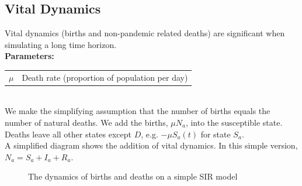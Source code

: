 \documentclass{article}
\begin{document}
\subsection{Vital Dynamics}
Vital dynamics (births and non-pandemic related deaths) are significant when simulating a long time horizon. \\
\textbf{Parameters:}\\
\begin{tabular}{rl}
$\mu$ &Death rate (proportion of population per day)\\
\end{tabular}\\
We make the simplifying assumption that the number of births equals the number of natural deaths. We add the births, $\mu N_a$, into the susceptible state. Deaths leave all other states except $D$, e.g. $-\mu S_a(t)$ for state $S_a$.\\
A simplified diagram shows the addition of vital dynamics. In this simple version, $N_a = S_a + I_a + R_a$.\\
\begin{figure}[!ht]
    \centering
{}
    \caption{The dynamics of births and deaths on a simple SIR model}
    \label{fig:SEIR-V}
\end{figure}
\end{document}
